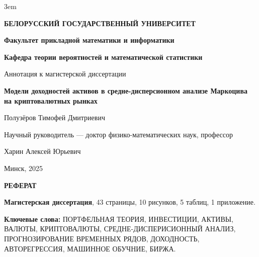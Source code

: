 

\emergencystretch 3em


\begin{titlepage}
    
    \begin{center}
        \textbf{БЕЛОРУССКИЙ ГОСУДАРСТВЕННЫЙ УНИВЕРСИТЕТ}
        
        \textbf{Факультет прикладной математики и информатики}
        
        \textbf{Кафедра теории вероятностей и математической статистики}
    \end{center}
    
    \vspace{180pt}
    
    \begin{center}
        Аннотация к магистерской диссертации
        
        \vspace{20pt}
        
        \textbf{Модели доходностей активов в средне-дисперсионном анализе Маркоцива на криптовалютных рынках}
        
        \vspace{20pt}
        
        Полузёров Тимофей Дмитриевич
        
        \vspace{20pt}
        
        Научный руководитель --- доктор физико-математических наук, профессор
        
        Харин Алексей Юрьевич
        
    \end{center}
    
    \vspace{200pt}
    
    \begin{center}
        Минск, 2025
    \end{center}
\end{titlepage}

\newpage

\begin{center}
    \textbf{РЕФЕРАТ}
\end{center}

    \textbf{Магистерская диссертация}, 43 страницы, 10 рисунков, 5 таблиц, 1 приложение.

    \textbf{Ключевые слова:}
    ПОРТФЕЛЬНАЯ ТЕОРИЯ, ИНВЕСТИЦИИ, АКТИВЫ, ВАЛЮТЫ, КРИПТОВАЛЮТЫ, СРЕДНЕ-ДИСПЕРИСИОННЫЙ АНАЛИЗ, ПРОГНОЗИРОВАНИЕ ВРЕМЕННЫХ РЯДОВ,
    ДОХОДНОСТЬ, АВТОРЕГРЕССИЯ, МАШИННОЕ ОБУЧНИЕ, БИРЖА.

